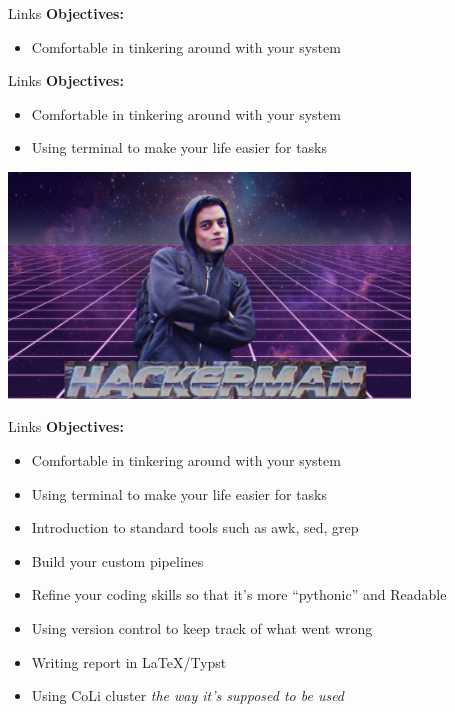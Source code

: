 \documentclass[aspectratio=169]{beamer}
\begin{document}
\begin{frame}{Links}
\textbf{Objectives:}
\begin{itemize}
    \item Comfortable in tinkering around with your system
\end{itemize}
\end{frame}

\begin{frame}{Links}
\textbf{Objectives:}
\begin{itemize}
    \item Comfortable in tinkering around with your system
    \item Using terminal to make your life easier for tasks
\end{itemize}
\centering
\includegraphics[height=0.4\textwidth,width=0.8\textwidth]{Images/hackerman.png}
\end{frame}

\begin{frame}{Links}
\textbf{Objectives:}
\begin{itemize}
    \item Comfortable in tinkering around with your system
    \item Using terminal to make your life easier for tasks
    \item Introduction to standard tools such as awk, sed, grep
    \item Build your custom pipelines
    \item Refine your coding skills so that it's more ``pythonic'' and Readable
    \item Using version control to keep track of what went wrong
    \item Writing report in \LaTeX/Typst
    \item Using CoLi cluster \textit{the way it's supposed to be used}
\end{itemize}
\end{frame}
\end{document}
